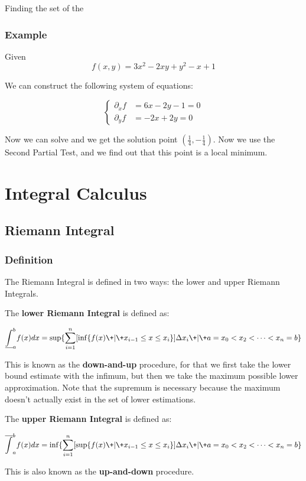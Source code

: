 \documentclass[11 pt, twoside]{article}
\begin{document}
Finding the set of the 

\subsubsection{Example}
Given 
$$f(x, y) = 3x^2 - 2xy + y^2 - x + 1$$

We can construct the following system of equations:

\[
\begin{cases}
\partial_x f &= 6x - 2y - 1 = 0\\
\partial_y f &= -2x + 2y = 0
\end{cases}
\]

Now we can solve and we get the solution point $(\frac{1}{4}, -\frac{1}{4})$.
Now we use the Second Partial Test, and we find out that this point is a local
minimum.

\section{Integral Calculus}
\subsection{Riemann Integral}

\subsubsection{Definition}
The Riemann Integral is defined in two ways: the lower and upper Riemann
Integrals.

The \textbf{lower Riemann Integral} is defined as:

$$\underline{\int}_a^b f(x) dx = \sup \{ \sum_{i=1}^n [\inf\{ f(x) \+|\+ x_{i-1} \leq x \leq
x_i\}] \Delta x_i \+|\+ a = x_0 < x_2 < \dots < x_n = b\}$$

This is known as the \textbf{down-and-up} procedure, for that we first take the
lower bound estimate with the infimum, but then we take the maximum possible
lower approximation. Note that the supremum is necessary because the maximum
doesn't actually exist in the set of lower estimations.

The \textbf{upper Riemann Integral} is defined as:

$$\overline{\int}_a^b f(x) dx = \inf \{ \sum_{i=1}^n [\sup\{ f(x) \+|\+ x_{i-1} \leq x \leq
x_i\}] \Delta x_i \+|\+ a = x_0 < x_2 < \dots < x_n = b\}$$

This is also known as the \textbf{up-and-down} procedure.
\end{document}
